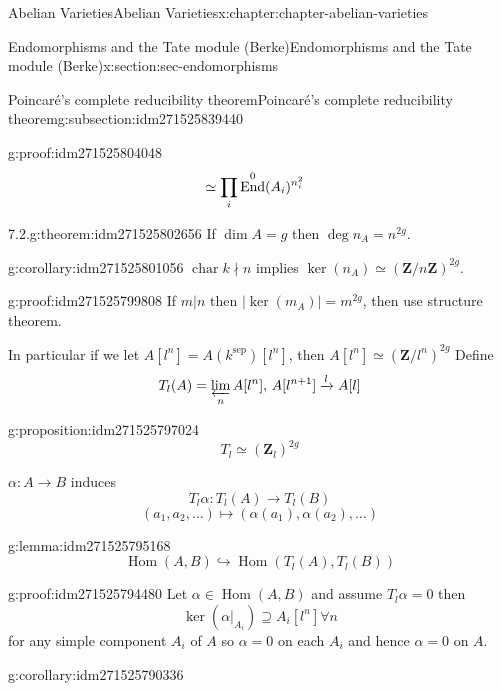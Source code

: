 \documentclass[oneside,10pt,]{book}
\newcommand{\qedhere}{\relax}
\numberwithin{equation}{section}
\newcommand{\lb}{[}
\newcommand{\rb}{]}
\newcommand{\ZZ}{\mathbf{Z}}
\newcommand{\sep}{\mathrm{sep}}
\DeclareMathOperator{\End}{End}
\DeclareMathOperator{\Hom}{Hom}
\DeclareMathOperator{\characteristic}{char}
\newcommand{\amp}{&}
\begin{document}
\begin{chapterptx}{Abelian Varieties}{}{Abelian Varieties}{}{}{x:chapter:chapter-abelian-varieties}
\begin{sectionptx}{Endomorphisms and the Tate module (Berke)}{}{Endomorphisms and the Tate module (Berke)}{}{}{x:section:sec-endomorphisms}
\begin{subsectionptx}{Poincaré's complete reducibility theorem}{}{Poincaré's complete reducibility theorem}{}{}{g:subsection:idm271525839440}
\begin{proofptx}{}{g:proof:idm271525804048}
\begin{align*}
\amp \simeq \prod_{i} \End^0(A_i)^{n_i^2}\qedhere
\end{align*}
%
\end{proofptx}
\begin{theorem}{7.2.}{}{g:theorem:idm271525802656}%
If \(\dim A = g\) then \(\deg n_A  =n^{2g}\).%
\end{theorem}
\begin{corollary}{}{}{g:corollary:idm271525801056}%
\(\characteristic k \nmid n\) implies \(\ker(n_A) \simeq (\ZZ/n\ZZ)^{2g}\).%
\end{corollary}
\begin{proofptx}{}{g:proof:idm271525799808}
If  \(m | n\) then \(|\ker (m_A)| = m^{2g}\), then use structure theorem.%
\end{proofptx}
In particular if we let \(A\lb l^n\rb = A(k^\sep) \lb l^n\rb\), then \(A\lb l^n\rb \simeq (\ZZ/l^n)^{2g}\) Define%
\begin{equation*}
T_l(A) = \varprojlim_n A[l^n],\, A[l^{n+1}] \xrightarrow{l} A[l]
\end{equation*}
%
\begin{proposition}{}{}{g:proposition:idm271525797024}%
%
\begin{equation*}
T_l \simeq (\ZZ_l)^{2g}
\end{equation*}
%
\end{proposition}
\(\alpha \colon A \to B\) induces%
\begin{equation*}
T_l\alpha\colon T_l(A) \to T_l(B)
\end{equation*}
%
\begin{equation*}
(a_1,a_2, \ldots) \mapsto(\alpha(a_1),\alpha(a_2), \ldots)
\end{equation*}
%
\begin{lemma}{}{}{g:lemma:idm271525795168}%
%
\begin{equation*}
\Hom(A,B) \hookrightarrow \Hom(T_l(A), T_l(B))
\end{equation*}
%
\end{lemma}
\begin{proofptx}{}{g:proof:idm271525794480}
Let \(\alpha \in \Hom(A,B)\) and assume \(T_l \alpha = 0\) then%
\begin{equation*}
\ker (\alpha|_{A_i}) \supseteq A_i[l^n] \forall n
\end{equation*}
for any simple component \(A_i\) of \(A\) so \(\alpha =0\) on each \(A_i\) and hence \(\alpha = 0\) on \(A\).%
\end{proofptx}
\begin{corollary}{}{}{g:corollary:idm271525790336}%

\end{corollary}
\end{subsectionptx}
\end{sectionptx}
\end{chapterptx}
\end{document}
